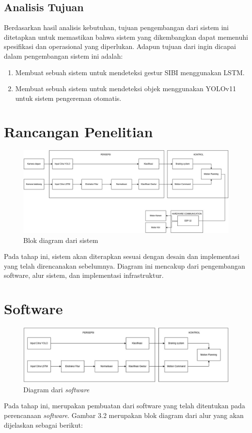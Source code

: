 \subsection{Analisis Tujuan}
Berdasarkan hasil analisis kebutuhan, tujuan pengembangan dari sistem ini ditetapkan untuk
memastikan bahwa sistem yang dikembangkan dapat memenuhi spesifikasi dan operasional
yang diperlukan. Adapun tujuan dari ingin dicapai dalam pengembangan sistem ini adalah:
\begin{enumerate}
    \item Membuat sebuah sistem untuk mendeteksi gestur SIBI menggunakan LSTM.
    \item Membuat sebuah sistem untuk mendeteksi objek menggunakan YOLOv11 untuk sistem pengereman otomatis.
\end{enumerate}

\section{Rancangan Penelitian}
\begin{figure} [H] \centering
  \includegraphics[scale=0.4]{gambar/rancangan penelitian.jpg}
  \caption{Blok diagram dari sistem}
  \label{fig:rancangan penelitian}
\end{figure}
Pada tahap ini, sistem akan diterapkan sesuai dengan desain dan implementasi yang telah direncanakan sebelumnya. Diagram ini mencakup dari pengembangan software, alur sistem, dan implementasi infrastruktur. 
\section{Software}
\begin{figure} [H] \centering
  \includegraphics[scale=0.4]{gambar/software new.jpg}
  \caption{Diagram dari \emph{software}}
  \label{fig:diagram software}
\end{figure}
Pada tahap ini, merupakan pembuatan dari software yang telah ditentukan pada perencanaan \emph{software}. Gambar 3.2 merupakan blok diagram dari alur yang akan dijelaskan sebagai berikut:

